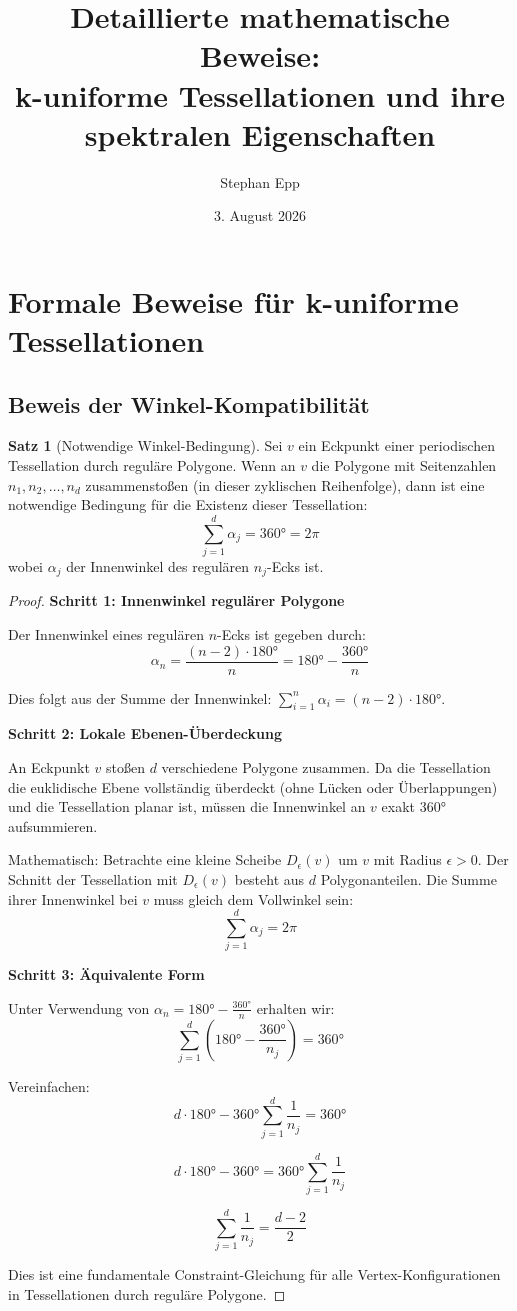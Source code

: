 \documentclass[a4paper,12pt]{article}
\title{Detaillierte mathematische Beweise:\\
k-uniforme Tessellationen und ihre spektralen Eigenschaften}
\author{Stephan Epp}
\date{3. August 2026}
\theoremstyle{definition}
\newtheorem{satz}{Satz}[section]
\begin{document}
\maketitle

\section{Formale Beweise für k-uniforme Tessellationen}

\subsection{Beweis der Winkel-Kompatibilität}

\begin{satz}[Notwendige Winkel-Bedingung]
	Sei $v$ ein Eckpunkt einer periodischen Tessellation durch reguläre Polygone. Wenn an $v$ die Polygone mit Seitenzahlen $n_1, n_2, \ldots, n_d$ zusammenstoßen (in dieser zyklischen Reihenfolge), dann ist eine notwendige Bedingung für die Existenz dieser Tessellation:
	\[
	\sum_{j=1}^{d} \alpha_j = 360° = 2\pi
	\]
	wobei $\alpha_j$ der Innenwinkel des regulären $n_j$-Ecks ist.
\end{satz}

\begin{proof}
	\textbf{Schritt 1: Innenwinkel regulärer Polygone}
	
	Der Innenwinkel eines regulären $n$-Ecks ist gegeben durch:
	\[
	\alpha_n = \frac{(n-2) \cdot 180°}{n} = 180° - \frac{360°}{n}
	\]
	
	Dies folgt aus der Summe der Innenwinkel: $\sum_{i=1}^{n} \alpha_i = (n-2) \cdot 180°$.
	
	\textbf{Schritt 2: Lokale Ebenen-Überdeckung}
	
	An Eckpunkt $v$ stoßen $d$ verschiedene Polygone zusammen. Da die Tessellation die euklidische Ebene vollständig überdeckt (ohne Lücken oder Überlappungen) und die Tessellation planar ist, müssen die Innenwinkel an $v$ exakt $360°$ aufsummieren.
	
	Mathematisch: Betrachte eine kleine Scheibe $D_\epsilon(v)$ um $v$ mit Radius $\epsilon > 0$. Der Schnitt der Tessellation mit $D_\epsilon(v)$ besteht aus $d$ Polygonanteilen. Die Summe ihrer Innenwinkel bei $v$ muss gleich dem Vollwinkel sein:
	\[
	\sum_{j=1}^{d} \alpha_j = 2\pi
	\]
	
	\textbf{Schritt 3: Äquivalente Form}
	
	Unter Verwendung von $\alpha_n = 180° - \frac{360°}{n}$ erhalten wir:
	\[
	\sum_{j=1}^{d} \left( 180° - \frac{360°}{n_j} \right) = 360°
	\]
	
	Vereinfachen:
	\[
	d \cdot 180° - 360° \sum_{j=1}^{d} \frac{1}{n_j} = 360°
	\]
	
	\[
	d \cdot 180° - 360° = 360° \sum_{j=1}^{d} \frac{1}{n_j}
	\]
	
	\[
	\sum_{j=1}^{d} \frac{1}{n_j} = \frac{d - 2}{2}
	\]
	
	Dies ist eine fundamentale Constraint-Gleichung für alle Vertex-Konfigurationen in Tessellationen durch reguläre Polygone.
\end{proof}
\end{document}
